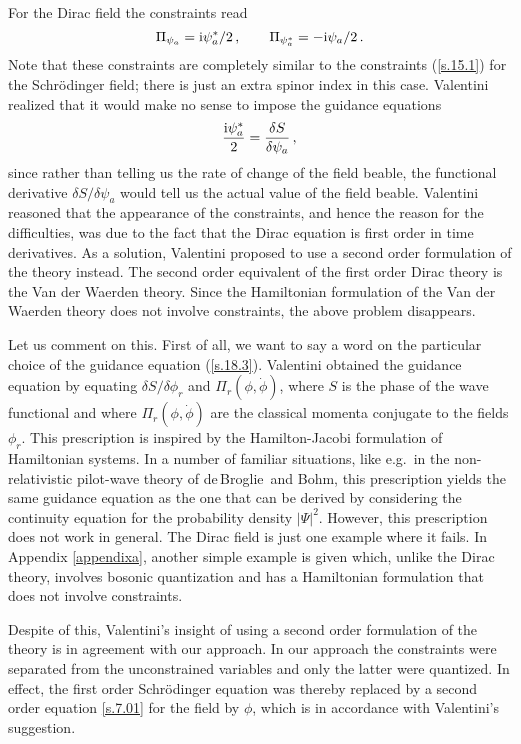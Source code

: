 \documentclass[12pt]{article}
\def\ii{\textrm i}
\newcommand{\db}{de$\,$Broglie}
\begin{document}
For the Dirac field the constraints read 
\begin{equation}
\Pi_{\psi_a}=\ii\psi^*_a/2\,, \qquad \Pi_{\psi^*_a}=-\ii\psi_a/2\,.
\label{s.18.2}
\end{equation}
Note that these constraints are completely similar to the constraints (\ref{s.15.1}) for the Schr\"o\-din\-ger field; there is just an extra spinor index in this case. Valentini realized that it would make no sense to impose the guidance equations
\begin{equation}
\frac{\ii\psi^*_a}{2} = \frac{\delta S}{\delta \psi_a}\,,
\label{s.18.3}
\end{equation}
since rather than telling us the rate of change of the field beable, the functional derivative $\delta S/\delta \psi_a$ would tell us the actual value of the field beable. Valentini reasoned that the appearance of the constraints, and hence the reason for the difficulties, was due to the fact that the Dirac equation is first order in time derivatives. As a solution, Valentini proposed to use a second order formulation of the theory instead. The second order equivalent of the first order Dirac theory is the Van der Waerden theory. Since the Hamiltonian formulation of the Van der Waerden theory does not involve constraints, the above problem disappears.

Let us comment on this. First of all, we want to say a word on the particular choice of the guidance equation (\ref{s.18.3}). Valentini obtained the guidance equation by equating $\delta S / \delta \phi_r$ and $ \Pi_r(\phi,\dot{\phi})$, where $S$ is the phase of the wave functional and where $\Pi_r(\phi,\dot{\phi})$ are the classical momenta conjugate to the fields $\phi_r$. This prescription is inspired by the Hamilton-Jacobi formulation of Hamiltonian systems. In a number of familiar situations, like e.g.\ in the non-relativistic pilot-wave theory of \db\ and Bohm, this prescription yields the same guidance equation as the one that can be derived by considering the continuity equation for the probability density $|\Psi|^2$. However, this prescription does not work in general. The Dirac field is just one example where it fails. In Appendix \ref{appendixa}, another simple example is given which, unlike the Dirac theory, involves bosonic quantization and has a Hamiltonian formulation that does not involve constraints. 

Despite of this, Valentini's insight of using a second order formulation of the theory is in agreement with our approach. In our approach the constraints were separated from the unconstrained variables and only the latter were quantized. In effect, the first order Schr{\"o}\-ding\-er equation was thereby replaced by a second order equation \eqref{s.7.01} for the field by $\phi$, which is in accordance with Valentini's suggestion.
\end{document}
